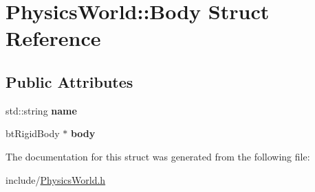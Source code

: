 \hypertarget{structPhysicsWorld_1_1Body}{
\section{PhysicsWorld::Body Struct Reference}
\label{structPhysicsWorld_1_1Body}
}
\subsection*{Public Attributes}
\begin{DoxyCompactItemize}
\item 
\hypertarget{structPhysicsWorld_1_1Body_a76d993462af7a4aef4bb58d53e780679}{
std::string {\bfseries name}}
\label{structPhysicsWorld_1_1Body_a76d993462af7a4aef4bb58d53e780679}

\item 
\hypertarget{structPhysicsWorld_1_1Body_a7a98d8e1416c0ec47fa6a5831ea317c9}{
btRigidBody $\ast$ {\bfseries body}}
\label{structPhysicsWorld_1_1Body_a7a98d8e1416c0ec47fa6a5831ea317c9}

\end{DoxyCompactItemize}


The documentation for this struct was generated from the following file:\begin{DoxyCompactItemize}
\item 
include/\hyperlink{PhysicsWorld_8h}{PhysicsWorld.h}\end{DoxyCompactItemize}
